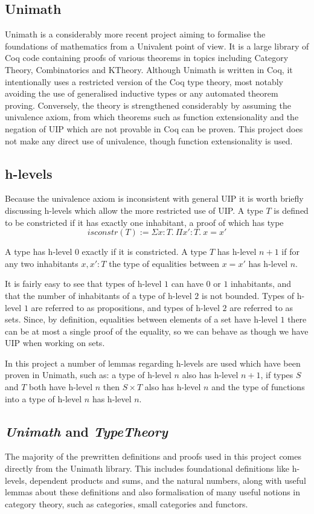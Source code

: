 \documentclass[12pt,a4paper,twoside,openright]{report}
\begin{document}
\subsection{Unimath}
Unimath is a considerably more recent project aiming to formalise the
foundations of mathematics from a Univalent point of view. It is a large library
of Coq code containing proofs of various theorems in topics including Category
Theory, Combinatorics and KTheory. Although Unimath is written in Coq, it
intentionally uses a restricted version of the Coq type theory, most notably
avoiding the use of generalised inductive types or any automated theorem
proving. Conversely, the theory is strengthened considerably by assuming the
univalence axiom, from which theorems such as function extensionality and the
negation of UIP which are not provable in Coq can be proven. This project does
not make any direct use of univalence, though function extensionality is used.

\subsection{h-levels}
Because the univalence axiom is inconsistent with general UIP it is worth
briefly discussing h-levels which allow the more restricted use of UIP. A type
$T$ is defined to be constricted if it has exactly one inhabitant, a proof of
which has type
\[isconstr(T) := \Sigma x:T.\ \Pi x':T.\ x=x'\]

A type has h-level $0$ exactly if it is constricted. A type $T$ has h-level
$n+1$ if for any two inhabitants $x, x': T$ the type of equalities between
$x=x'$ has h-level $n$.

It is fairly easy to see that types of h-level $1$ can have $0$ or $1$
inhabitants, and that the number of inhabitants of a type of h-level $2$ is not
bounded. Types of h-level $1$ are referred to as propositions, and types of
h-level $2$ are referred to as sets. Since, by definition, equalities between
elements of a set have h-level $1$ there can be at most a single proof of the
equality, so we can behave as though we have UIP when working on sets.

In this project a number of lemmas regarding h-levels are used which have been
proven in Unimath, such as: a type of h-level $n$ also has h-level $n+1$, if
types $S$ and $T$ both have h-level $n$ then $S\times T$ also has h-level $n$
and the type of functions into a type of h-level $n$ has h-level $n$.

\subsection{\textit{Unimath} and \textit{TypeTheory}}
The majority of the prewritten definitions and proofs used in this project comes
directly from the Unimath library. This includes foundational definitions like
h-levels, dependent products and sums, and the natural numbers, along with
useful lemmas about these definitions and also formalisation of many useful
notions in category theory, such as categories, small categories and functors.
\end{document}
